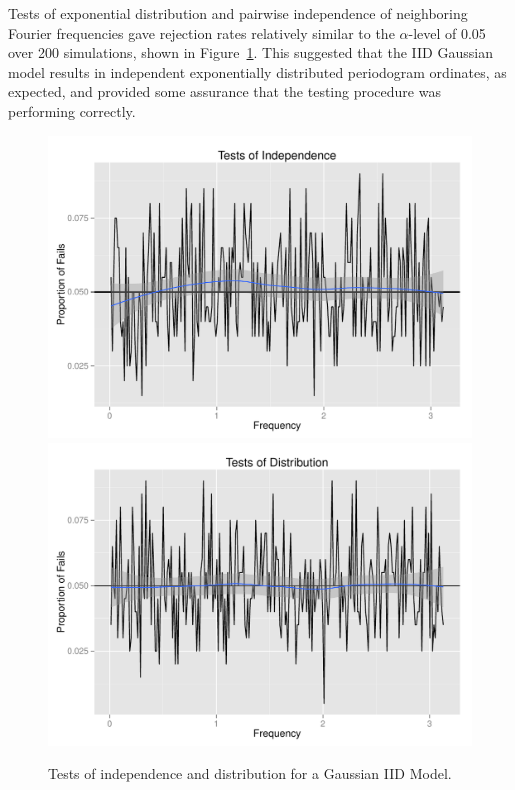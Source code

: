\documentclass{article}\usepackage{graphicx, color}
\newenvironment{knitrout}{}{} %
\theoremstyle{plain}
\begin{document}
Tests of exponential distribution and pairwise independence of neighboring Fourier frequencies gave rejection rates relatively similar to the $\alpha$-level of 0.05 over 200 simulations, shown in Figure~\ref{fig:tests-iid}. This suggested that the IID Gaussian model results in independent exponentially distributed periodogram ordinates, as expected, and provided some assurance that the testing procedure was performing correctly.

\begin{knitrout}
\color{fgcolor}\begin{figure}[H]

\includegraphics[width=.49\textwidth]{figure/tests-iid1} 
\includegraphics[width=.49\textwidth]{figure/tests-iid2} \caption[Tests of independence and distribution for a Gaussian IID Model]{Tests of independence and distribution for a Gaussian IID Model.\label{fig:tests-iid}}
\end{figure}


\end{knitrout}
\end{document}
